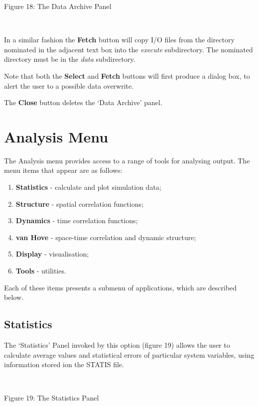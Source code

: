 \vskip 5mm
\centerline{}
\centerline{Figure 18: The Data Archive Panel}
\vskip 5mm

~

\noindent
In a similar fashion the {\bf Fetch} button will copy \DD{} I/O files
from the directory nominated in the adjacent text box into the {\em
execute} subdirectory. The nominated directory must be in the \DD{} {\em
data} subdirectory.

Note that both the {\bf Select} and {\bf Fetch} buttons will first
produce a dialog box, to alert the user to a possible data overwrite.

The {\bf Close} button deletes the `Data Archive' panel.

\section{Analysis Menu}
The Analysis menu provides access to a range of tools for analysing \DD{}
output. The menu items that appear are as follows:
\begin{enumerate}
\item {\bf Statistics} - calculate and plot simulation data;
\item {\bf Structure} - spatial correlation functions;
\item {\bf Dynamics} - time correlation functions;
\item {\bf van Hove} - space-time correlation and dynamic structure;
\item {\bf Display} - visualisation;
\item {\bf Tools} - utilities.
\end{enumerate}
Each of these items presents a submenu of applications, which are
described below.
\subsection{\bf Statistics}
The `Statistics' Panel invoked by this option (figure 19) allows the
user to calculate average values and statistical errors of particular
system variables, using information stored ion the \DD{} STATIS file.


~

\begin{center}
\centerline{}
\centerline{Figure 19: The Statistics Panel}
\end{center}

~

